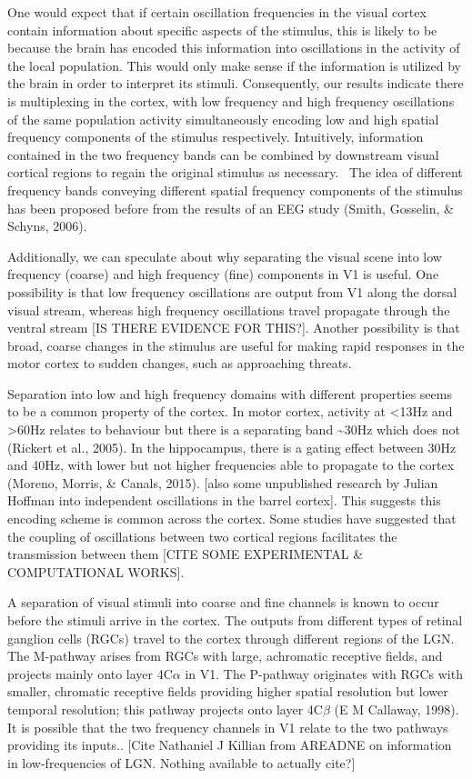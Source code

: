 One would expect that if certain oscillation frequencies in the visual cortex contain information about specific aspects of the stimulus, this is likely to be because the brain has encoded this information into oscillations in the activity of the local population. This would only make sense if the information is utilized by the brain in order to interpret its stimuli. Consequently, our results indicate there is multiplexing in the cortex, with low frequency and high frequency oscillations of the same population activity simultaneously encoding low and high spatial frequency components of the stimulus respectively. Intuitively, information contained in the two frequency bands can be combined by downstream visual cortical regions to regain the original stimulus as necessary. \ The idea of different frequency bands conveying different spatial frequency components of the stimulus has been proposed before from the results of an EEG study (Smith, Gosselin, \& Schyns, 2006).

Additionally, we can speculate about why separating the visual scene into low frequency (coarse) and high frequency (fine) components in V1 is useful. One possibility is that low frequency oscillations are output from V1 along the dorsal visual stream, whereas high frequency oscillations travel propagate through the ventral stream [IS THERE EVIDENCE FOR THIS?]. Another possibility is that broad, coarse changes in the stimulus are useful for making rapid responses in the motor cortex to sudden changes, such as approaching threats.

Separation into low and high frequency domains with different properties seems to be a common property of the cortex. In motor cortex, activity at {\textless}13Hz and {\textgreater}60Hz relates to behaviour but there is a separating band \~{}30Hz which does not (Rickert et al., 2005). In the hippocampus, there is a gating effect between 30Hz and 40Hz, with lower but not higher frequencies able to propagate to the cortex (Moreno, Morris, \& Canals, 2015). [also some unpublished research by Julian Hoffman into independent oscillations in the barrel cortex]. This suggests this encoding scheme is common across the cortex. Some studies have suggested that the coupling of oscillations between two cortical regions facilitates the transmission between them [CITE SOME EXPERIMENTAL \& COMPUTATIONAL WORKS].

A separation of visual stimuli into coarse and fine channels is known to occur before the stimuli arrive in the cortex. The outputs from different types of retinal ganglion cells (RGCs) travel to the cortex through different regions of the LGN. The M-pathway arises from RGCs with large, achromatic receptive fields, and projects mainly onto layer 4C$\alpha$ in V1. The P-pathway originates with RGCs with smaller, chromatic receptive fields providing higher spatial resolution but lower temporal resolution; this pathway projects onto layer 4C$\beta$ (E M Callaway, 1998). It is possible that the two frequency channels in V1 relate to the two pathways providing its inputs.. [Cite Nathaniel J Killian from AREADNE on information in low-frequencies of LGN. Nothing available to actually cite?]

